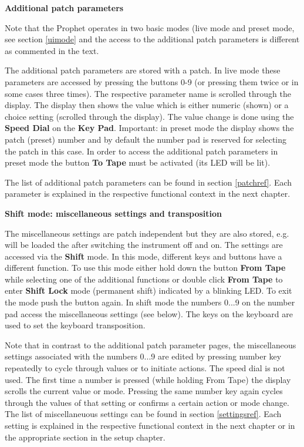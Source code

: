 \documentclass[draft,landscape, 11pt, oneside]{report}
\newenvironment{flowtext}{\addmargin[0cm]{7cm}}{\endaddmargin} %
\begin{document}
\begin{flowtext}
\textbf{Additional patch parameters}

Note that the Prophet operates in two basic modes (live mode and preset mode, see section \ref{uimode} and the access to the additional patch parameters is different as commented in the text.

The additional patch parameters are stored with a patch. In live mode these parameters are accessed by pressing the buttons 0-9 (or pressing them twice or in some cases three times). The respective parameter name is scrolled through the display. The display then shows the value which is either numeric (shown) or a choice setting (scrolled through the display). The value change is done using the \textbf{Speed Dial} on the \textbf{Key Pad}. Important: in preset mode the display shows the patch (preset) number and by default the number pad is reserved for selecting the patch in this case. In order to access the additional patch parameters in preset mode the button \textbf{To Tape} must be activated (its LED will be lit).
       
The list of additional patch parameters can be found in section \ref{patchref}. Each parameter is explained in the respective functional context in the next chapter.

\textbf{Shift mode: miscellaneous settings and transposition}

The miscellaneous settings are patch independent but they are also stored, e.g. will be loaded the after switching the instrument off and on. The settings are accessed via the \textbf{Shift} mode. In this mode, different keys and buttons have a different function. To use this mode either hold down the button \textbf{From Tape} while selecting one of the additional functions or double click \textbf{From Tape} to enter \textbf{Shift Lock} mode (permanent shift) indicated by a blinking LED. To exit the mode push the button again. In shift mode the numbers 0...9 on the number pad access the miscellaneous settings (see below). The keys on the keyboard are used to set the keyboard transposition. 

Note that in contrast to the additional patch parameter pages, the miscellaneous settings associated with the numbers 0...9 are edited by pressing number key repeatedly to cycle through values or to initiate actions. The speed dial is not used. The first time a number is pressed (while holding From Tape) the display scrolls the current value or mode. Pressing the same number key again cycles through the values of that setting or confirms a certain action or mode change. The list of miscellaneuous settings can be found in section \ref{settingsref}. Each setting is explained in the respective functional context in the next chapter or in the appropriate section in the setup chapter.


\end{flowtext}
\end{document}
